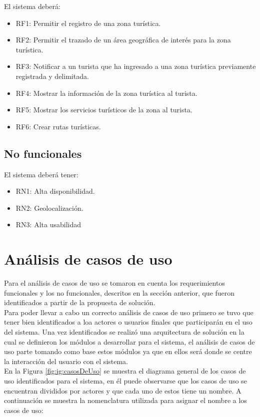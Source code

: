 El sistema deberá:

\begin{itemize}
	\item RF1: Permitir el registro de una zona turística.
	\item RF2: Permitir el trazado de un área geográfica de interés para la zona turística.
	\item RF3: Notificar a un turista que ha ingresado a una zona turística previamente registrada y delimitada.
	\item RF4: Mostrar la información de la zona turística al turista.
	\item RF5: Mostrar los servicios turísticos de la zona al turista.
	\item RF6: Crear rutas turísticas.
\end{itemize}

\hypertarget{cv:noFuncionales}{\subsection{No funcionales}}

El sistema deberá tener: 

\begin{itemize}
	\item RN1: Alta disponibilidad.
	\item RN2: Geolocalización.
	\item RN3: Alta usabilidad
\end{itemize}

\section{Análisis de casos de uso}
Para el análisis de casos de uso se tomaron en cuenta los requerimientos funcionales y los no funcionales, descritos en la sección anterior, que fueron identificados a partir de la propuesta de solución. \\

Para poder llevar a cabo un correcto análisis de casos de uso primero se tuvo que tener bien identificados a loa actores o usuarios finales que participarán en el uso del sistema. Una vez identificados se realizó una arquitectura de solución en la cual se definieron los módulos a desarrollar para el sistema, el análisis de casos de uso parte tomando como base estos módulos ya que en ellos será donde se centre la interacción del usuario con el sistema. \\

En la Figura \ref{fig:ig:casosDeUso} se muestra el diagrama general de los casos de uso identificados para el sistema, en él puede observarse que los casos de uso se encuentran divididos por actores y que cada uno de estos tiene un nombre. A continuación se muestra la nomenclatura utilizada para asignar el nombre a los casos de uso:

